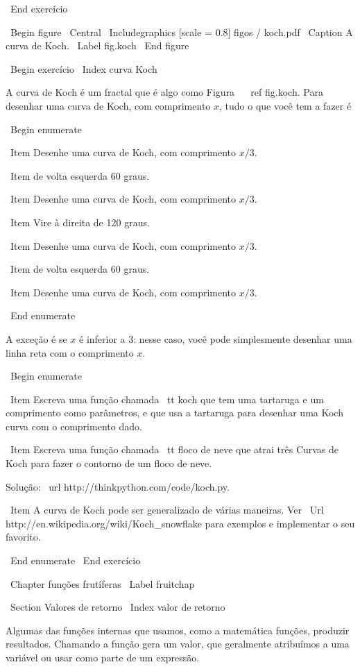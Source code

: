 \documentclass[10pt]{book}
\begin{document}
\begin {itemize}
{{{\ End {} exercício


\ Begin {figure}
\ Central
{\ Includegraphics [scale = 0.8] {figos / koch.pdf}}
\ Caption {A curva de Koch.}
\ Label {} fig.koch
\ End {figure}

\ Begin {} exercício
\ Index {curva Koch}

A curva de Koch é um fractal que é algo como
Figura ~ \ ref {} fig.koch. Para desenhar uma curva de Koch, com comprimento $ x $, tudo o que você
tem a fazer é

\ Begin {enumerate}

\ Item Desenhe uma curva de Koch, com comprimento $ x / 3 $.

\ Item de volta esquerda 60 graus.

\ Item Desenhe uma curva de Koch, com comprimento $ x / 3 $.

\ Item Vire à direita de 120 graus.

\ Item Desenhe uma curva de Koch, com comprimento $ x / 3 $.

\ Item de volta esquerda 60 graus.

\ Item Desenhe uma curva de Koch, com comprimento $ x / 3 $.

\ End {enumerate}

A exceção é se $ x $ é inferior a 3: nesse caso,
você pode simplesmente desenhar uma linha reta com o comprimento $ x $.

\ Begin {enumerate}

\ Item Escreva uma função chamada {\ tt koch} que tem uma tartaruga e
um comprimento como parâmetros, e que usa a tartaruga para desenhar uma Koch
curva com o comprimento dado.

\ Item Escreva uma função chamada {\ tt} floco de neve que atrai três
Curvas de Koch para fazer o contorno de um floco de neve.

Solução: \ url {http://thinkpython.com/code/koch.py}.

\ Item A curva de Koch pode ser generalizado de várias maneiras. Ver
\ Url {} http://en.wikipedia.org/wiki/Koch_snowflake para exemplos e
implementar o seu favorito.

\ End {enumerate}
\ End {} exercício


\ Chapter {funções frutíferas}
\ Label {} fruitchap

\ Section {Valores de retorno}
\ Index {valor de retorno}

Algumas das funções internas que usamos, como a matemática
funções, produzir resultados. Chamando a função gera um
valor, que geralmente atribuímos a uma variável ou usar como parte de um
expressão.

}}}
\end{itemize}
\end{document}
